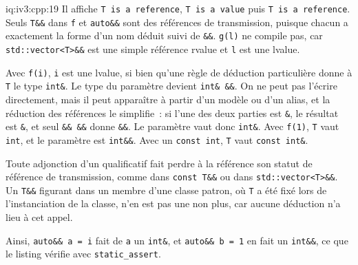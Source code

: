 \begin{solution}{iq:iv3:cpp:19}
Il affiche \texttt{T is a reference}, \texttt{T is a value} puis \texttt{T is a reference}. Seuls \texttt{T\&\&} dans \texttt{f} et \texttt{auto\&\&} sont des références de transmission, puisque chacun a exactement la forme d'un nom déduit suivi de \texttt{\&\&}. \texttt{g(l)} ne compile pas, car \texttt{std::vector<T>\&\&} est une simple référence rvalue et \texttt{l} est une lvalue.

Avec \texttt{f(i)}, \texttt{i} est une lvalue, si bien qu'une règle de déduction particulière donne à \texttt{T} le type \texttt{int\&}. Le type du paramètre devient \texttt{int\& \&\&}. On ne peut pas l'écrire directement, mais il peut apparaître à partir d'un modèle ou d'un alias, et la réduction des références le simplifie~: si l'une des deux parties est \texttt{\&}, le résultat est \texttt{\&}, et seul \texttt{\&\& \&\&} donne \texttt{\&\&}. Le paramètre vaut donc \texttt{int\&}. Avec \texttt{f(1)}, \texttt{T} vaut \texttt{int}, et le paramètre est \texttt{int\&\&}. Avec un \texttt{const int}, \texttt{T} vaut \texttt{const int\&}.

Toute adjonction d'un qualificatif fait perdre à la référence son statut de référence de transmission, comme dans \texttt{const T\&\&} ou dans \texttt{std::vector<T>\&\&}. Un \texttt{T\&\&} figurant dans un membre d'une classe patron, où \texttt{T} a été fixé lors de l'instanciation de la classe, n'en est pas une non plus, car aucune déduction n'a lieu à cet appel.

Ainsi, \texttt{auto\&\& a = i} fait de \texttt{a} un \texttt{int\&}, et \texttt{auto\&\& b = 1} en fait un \texttt{int\&\&}, ce que le listing vérifie avec \texttt{static\_assert}.

\end{solution}

